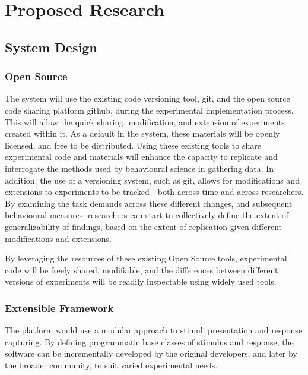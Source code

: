 \documentclass[12pt,a4paper,titlepage]{scrreprt}
\begin{document}
\chapter{Proposed Research}
\section{System Design}
\subsection{Open Source}

The system will use the existing code versioning tool, git\cite{_git_????}, and the open source code sharing platform github\cite{_github_????}, during the experimental implementation process. This will allow the quick sharing, modification, and extension of experiments created within it. As a default in the system, these materials will be openly licensed, and free to be distributed. Using these existing tools to share experimental code and materials will enhance the capacity to replicate and interrogate the methods used by behavioural science in gathering data\cite{giner-sorolla_science_2012,nosek_scientific_2012,miguel_promoting_2014}. In addition, the use of a versioning system, such as git, allows for modifications and extensions to experiments to be tracked - both across time and across researchers. By examining the task demands across these different changes, and subsequent behavioural measures, researchers can start to collectively define the extent of generalizability of findings, based on the extent of replication given different modifications and extensions.

By leveraging the resources of these existing Open Source tools, experimental code will be freely shared, modifiable, and the differences between different versions of experiments will be readily inspectable using widely used tools.
\subsection{Extensible Framework}
The platform would use a modular approach to stimuli presentation and response capturing. By defining programmatic base classes of stimulus and response, the software can be incrementally developed by the original developers, and later by the broader community, to suit varied experimental needs. 
\end{document}
